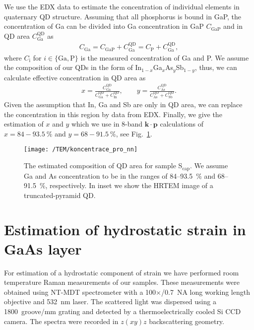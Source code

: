 We use the EDX data to estimate the concentration of individual elements in quaternary QD structure. Assuming that all phosphorus is bound in GaP, the concentration of Ga can be divided into Ga concentration in GaP $C_\mathrm{GaP}$ and in QD area $C_\mathrm{Ga}^\mathrm{QD}$ as
%
\begin{eqnarray}
C_\mathrm{Ga}=C_\mathrm{GaP}+C_\mathrm{Ga}^\mathrm{QD}=C_\mathrm{P}+C_\mathrm{Ga}^\mathrm{QD},
\end{eqnarray}
%
where $C_\mathrm{i}$ for $i \in \{\mathrm{Ga}, \mathrm{P}\}$ is the measured concentration of Ga and P. We assume the composition of our QDs in the form of In$_{1-x}$Ga$_{x}$As$_y$Sb$_{1-y}$, thus, we can calculate effective concentration in QD area as
%
\begin{eqnarray}
x=\frac{C_\mathrm{Ga}^\mathrm{QD}}{C_\mathrm{Ga}^\mathrm{QD}+C_\mathrm{In}^\mathrm{QD}},\qquad
y=\frac{C_\mathrm{As}^\mathrm{QD}}{C_\mathrm{As}^\mathrm{QD}+C_\mathrm{Sb}^\mathrm{QD}}.
\end{eqnarray}
%
Given the assumption that In, Ga and Sb are only in QD area, we can replace the concentration in this region by data from EDX. Finally, we give the estimation of $x$ and $y$ which we use in 8-band $\mathbf{k\cdot p}$ calculations of $x=84-93.5~\%$ and $y=68-91.5~\%$, see Fig.~\ref{fig:concentration_estimation}.


\begin{figure}
	\centering
	\texttt{[image: /TEM/koncentrace\_pro\_nn]} %
	\caption{The estimated composition of QD area for sample S$_\mathrm{cap}$. We assume Ga and As concentration to be in the ranges of 84--93.5~\% and 68--91.5~\%, respectively. In inset we show the HRTEM image of a truncated-pyramid QD.}
	\label{fig:concentration_estimation}
\end{figure}

{}

\section{Estimation of hydrostatic strain in GaAs layer}
For estimation of a hydrostatic component of strain we have performed room temperature Raman measurements of our samples. These measurements were obtained using NT-MDT spectrometer with a 100$\times$/0.7~NA long working length objective and 532~nm laser. The scattered light was dispersed using a 1800~groove/mm grating and detected by a thermoelectrically cooled Si CCD camera. The spectra were recorded in $z(xy)z$ backscattering geometry.

